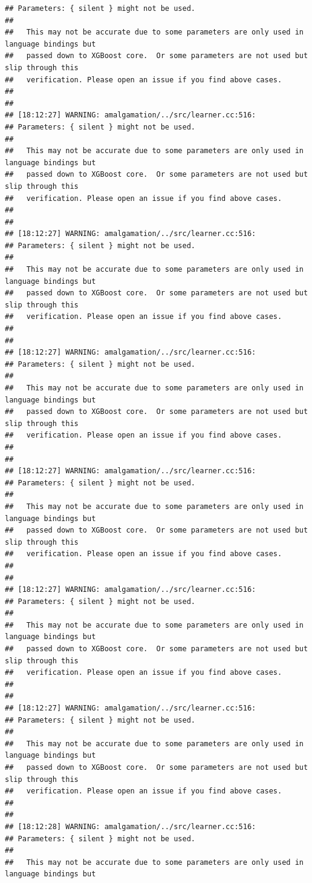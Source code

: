 \documentclass[AMS,STIX2COL]{WileyNJD-v2}\usepackage[]{graphicx}\usepackage[]{color}
\makeatletter
\newenvironment{kframe}{%
 \def\at@end@of@kframe{}%
 \ifinner\ifhmode%
  \def\at@end@of@kframe{\end{minipage}}%
  \begin{minipage}{\columnwidth}%
 \fi\fi%
 \def\FrameCommand##1{\hskip\@totalleftmargin \hskip-\fboxsep
 \colorbox{shadecolor}{##1}\hskip-\fboxsep
     \hskip-\linewidth \hskip-\@totalleftmargin \hskip\columnwidth}%
 \MakeFramed {\advance\hsize-\width
   \@totalleftmargin\z@ \linewidth\hsize
   \@setminipage}}%
 {\par\unskip\endMakeFramed%
 \at@end@of@kframe}
\newenvironment{knitrout}{}{} %
\makeatother
\begin{document}
\begin{knitrout}
\begin{kframe}
\begin{verbatim}
## Parameters: { silent } might not be used.
## 
##   This may not be accurate due to some parameters are only used in language bindings but
##   passed down to XGBoost core.  Or some parameters are not used but slip through this
##   verification. Please open an issue if you find above cases.
## 
## 
## [18:12:27] WARNING: amalgamation/../src/learner.cc:516: 
## Parameters: { silent } might not be used.
## 
##   This may not be accurate due to some parameters are only used in language bindings but
##   passed down to XGBoost core.  Or some parameters are not used but slip through this
##   verification. Please open an issue if you find above cases.
## 
## 
## [18:12:27] WARNING: amalgamation/../src/learner.cc:516: 
## Parameters: { silent } might not be used.
## 
##   This may not be accurate due to some parameters are only used in language bindings but
##   passed down to XGBoost core.  Or some parameters are not used but slip through this
##   verification. Please open an issue if you find above cases.
## 
## 
## [18:12:27] WARNING: amalgamation/../src/learner.cc:516: 
## Parameters: { silent } might not be used.
## 
##   This may not be accurate due to some parameters are only used in language bindings but
##   passed down to XGBoost core.  Or some parameters are not used but slip through this
##   verification. Please open an issue if you find above cases.
## 
## 
## [18:12:27] WARNING: amalgamation/../src/learner.cc:516: 
## Parameters: { silent } might not be used.
## 
##   This may not be accurate due to some parameters are only used in language bindings but
##   passed down to XGBoost core.  Or some parameters are not used but slip through this
##   verification. Please open an issue if you find above cases.
## 
## 
## [18:12:27] WARNING: amalgamation/../src/learner.cc:516: 
## Parameters: { silent } might not be used.
## 
##   This may not be accurate due to some parameters are only used in language bindings but
##   passed down to XGBoost core.  Or some parameters are not used but slip through this
##   verification. Please open an issue if you find above cases.
## 
## 
## [18:12:27] WARNING: amalgamation/../src/learner.cc:516: 
## Parameters: { silent } might not be used.
## 
##   This may not be accurate due to some parameters are only used in language bindings but
##   passed down to XGBoost core.  Or some parameters are not used but slip through this
##   verification. Please open an issue if you find above cases.
## 
## 
## [18:12:28] WARNING: amalgamation/../src/learner.cc:516: 
## Parameters: { silent } might not be used.
## 
##   This may not be accurate due to some parameters are only used in language bindings but

\end{verbatim}
\end{kframe}
\end{knitrout}
\end{document}
